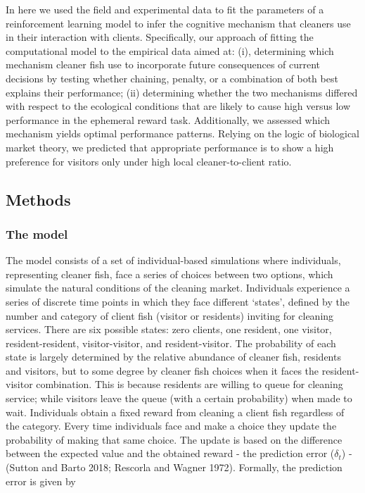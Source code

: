 \documentclass[
  12pt,
]{article}
\begin{document}
In here we used the field and experimental data to fit the parameters of
a reinforcement learning model to infer the cognitive mechanism that
cleaners use in their interaction with clients. Specifically, our
approach of fitting the computational model to the empirical data aimed
at: (i), determining which mechanism cleaner fish use to incorporate
future consequences of current decisions by testing whether chaining,
penalty, or a combination of both best explains their performance; (ii)
determining whether the two mechanisms differed with respect to the
ecological conditions that are likely to cause high versus low
performance in the ephemeral reward task. Additionally, we assessed
which mechanism yields optimal performance patterns. Relying on the
logic of biological market theory, we predicted that appropriate
performance is to show a high preference for visitors only under high
local cleaner-to-client ratio.

\hypertarget{methods}{%
\subsection{Methods}\label{methods}}

\hypertarget{the-model}{%
\subsubsection{The model}\label{the-model}}

The model consists of a set of individual-based simulations where
individuals, representing cleaner fish, face a series of choices between
two options, which simulate the natural conditions of the cleaning
market. Individuals experience a series of discrete time points in which
they face different `states', defined by the number and category of
client fish (visitor or residents) inviting for cleaning services. There
are six possible states: zero clients, one resident, one visitor,
resident-resident, visitor-visitor, and resident-visitor. The
probability of each state is largely determined by the relative
abundance of cleaner fish, residents and visitors, but to some degree by
cleaner fish choices when it faces the resident-visitor combination.
This is because residents are willing to queue for cleaning service;
while visitors leave the queue (with a certain probability) when made to
wait. Individuals obtain a fixed reward from cleaning a client fish
regardless of the category. Every time individuals face and make a
choice they update the probability of making that same choice. The
update is based on the difference between the expected value and the
obtained reward - the prediction error (\(\delta_t\)) - (Sutton and
Barto 2018; Rescorla and Wagner 1972). Formally, the prediction error is
given by
\end{document}
